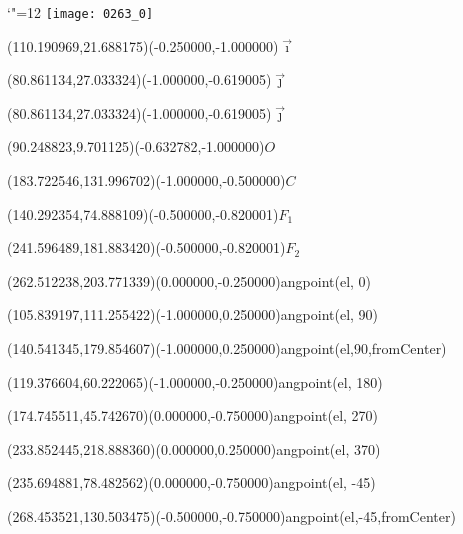 \documentclass[12pt]{article}
\begin{document}
\makeatletter%
\let\ASYencoding\f@encoding%
\let\ASYfamily\f@family%
\let\ASYseries\f@series%
\let\ASYshape\f@shape%
\makeatother%
{\catcode`"=12%
\texttt{[image: 0263\_0]}%
}%
\kern -341.433071pt%
%
%
\fontsize{12.000000}{14.400000}\selectfont%
\usefont{\ASYencoding}{\ASYfamily}{\ASYseries}{\ASYshape}%
\ASYalign(110.190969,21.688175)(-0.250000,-1.000000){$\vec{\imath}$}%
%
%
\fontsize{12.000000}{14.400000}\selectfont%
\ASYalign(80.861134,27.033324)(-1.000000,-0.619005){$\vec{\jmath}$}%
%
%
\fontsize{12.000000}{14.400000}\selectfont%
\ASYalign(80.861134,27.033324)(-1.000000,-0.619005){$\vec{\jmath}$}%
%
%
\fontsize{12.000000}{14.400000}\selectfont%
\ASYalign(90.248823,9.701125)(-0.632782,-1.000000){$O$}%
%
%
\fontsize{12.000000}{14.400000}\selectfont%
\ASYalign(183.722546,131.996702)(-1.000000,-0.500000){$C$}%
%
%
\fontsize{12.000000}{14.400000}\selectfont%
\ASYalign(140.292354,74.888109)(-0.500000,-0.820001){$F_1$}%
%
%
\fontsize{12.000000}{14.400000}\selectfont%
\ASYalign(241.596489,181.883420)(-0.500000,-0.820001){$F_2$}%
%
%
\fontsize{12.000000}{14.400000}\selectfont%
\ASYalign(262.512238,203.771339)(0.000000,-0.250000){angpoint(el, 0)}%
%
%
\fontsize{12.000000}{14.400000}\selectfont%
\ASYalign(105.839197,111.255422)(-1.000000,0.250000){angpoint(el, 90)}%
%
%
\fontsize{12.000000}{14.400000}\selectfont%
\ASYalign(140.541345,179.854607)(-1.000000,0.250000){angpoint(el,90,fromCenter)}%
%
%
\fontsize{12.000000}{14.400000}\selectfont%
\ASYalign(119.376604,60.222065)(-1.000000,-0.250000){angpoint(el, 180)}%
%
%
\fontsize{12.000000}{14.400000}\selectfont%
\ASYalign(174.745511,45.742670)(0.000000,-0.750000){angpoint(el, 270)}%
%
%
\fontsize{12.000000}{14.400000}\selectfont%
\ASYalign(233.852445,218.888360)(0.000000,0.250000){angpoint(el, 370)}%
%
%
\fontsize{12.000000}{14.400000}\selectfont%
\ASYalign(235.694881,78.482562)(0.000000,-0.750000){angpoint(el, -45)}%
%
%
\fontsize{12.000000}{14.400000}\selectfont%
\ASYalign(268.453521,130.503475)(-0.500000,-0.750000){angpoint(el,-45,fromCenter)}%
\end{document}

